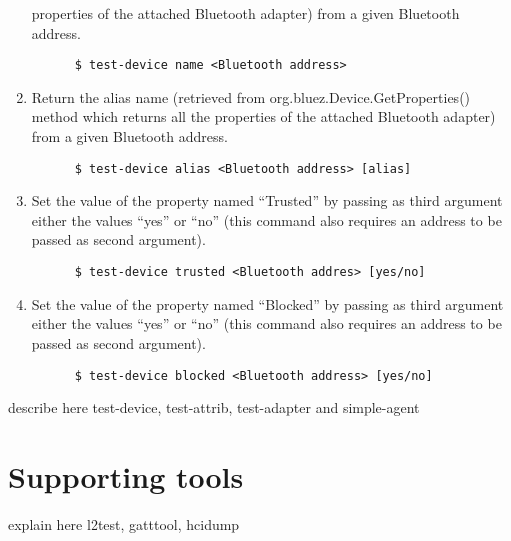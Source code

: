 \documentclass[11pt]{article}
\begin{document}
\begin{enumerate}
        properties of the attached Bluetooth adapter) from a given
        Bluetooth address.
    \begin{verbatim}
      $ test-device name <Bluetooth address>
    \end{verbatim}
  \item Return the alias name (retrieved from
        org.bluez.Device.GetProperties() method which returns all the
        properties of the attached Bluetooth adapter) from a given
        Bluetooth address.
    \begin{verbatim}
      $ test-device alias <Bluetooth address> [alias]
    \end{verbatim}
  \item Set the value of the property named ``Trusted'' by passing as
        third argument either the values ``yes'' or ``no''
        (this command also requires an address to be passed as second
         argument).
    \begin{verbatim}
      $ test-device trusted <Bluetooth addres> [yes/no]
    \end{verbatim}
  \item Set the value of the property named ``Blocked'' by passing as
        third argument either the values ``yes'' or ``no''
        (this command also requires an address to be passed as second
         argument).
    \begin{verbatim}
      $ test-device blocked <Bluetooth address> [yes/no]
    \end{verbatim}
\end{enumerate}

describe here test-device, test-attrib, test-adapter and simple-agent

\section{Supporting tools}

explain here l2test, gatttool, hcidump
\end{document}
